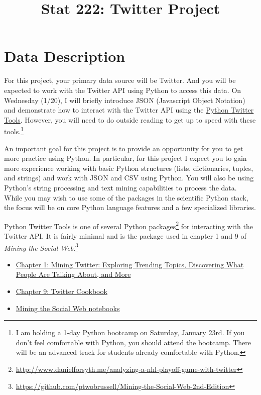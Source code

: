 \documentclass[11pt, oneside]{article}   	%
\title{Stat 222: Twitter Project}
\date{}							%
\begin{document}
\maketitle

\section{Data Description}

For this project, your primary data source will be Twitter.  And you will be
expected to work with the Twitter API using Python to access this data. On
Wednesday (1/20), I will briefly introduce JSON (Javascript Object
Notation) and demonstrate how to interact with the Twitter API using the
\href{https://github.com/sixohsix/twitter}{Python Twitter Tools}.  However, you
will need to do outside reading to get up to speed with these tools.\footnote{I
am holding a 1-day Python bootcamp on Saturday, January 23rd.  If you don't feel
comfortable with Python, you should attend the bootcamp.  There will be
an advanced track for students already comfortable with Python.}

An important goal for this project is to provide an opportunity for you to get
more practice using Python.  In particular, for this project I expect you to
gain more experience working with basic Python structures (lists, dictionaries,
tuples, and strings) and work with JSON and CSV using Python.  You will also be
using Python's string processing and text mining capabilities to process the
data.  While you may wish to use some of the packages in the scientific Python
stack, the focus will be on core Python language features and a few specialized
libraries.

Python Twitter Tools is one of several Python
packages\footnote{\url{http://www.danielforsyth.me/analyzing-a-nhl-playoff-game-with-twitter}}
for interacting with the Twitter API.  It is fairly minimal and is the package
used in chapter 1 and 9 of \emph{Mining the Social
Web}.\footnote{\url{https://github.com/ptwobrussell/Mining-the-Social-Web-2nd-Edition}}
\begin{itemize}
\item \href{https://rawgit.com/ptwobrussell/Mining-the-Social-Web-2nd-Edition/master/ipynb/html/Chapter%201%20-%20Mining%20Twitter.html}{Chapter 1: Mining Twitter: Exploring Trending Topics, Discovering What People Are Talking About, and More}
\item \href{https://rawgit.com/ptwobrussell/Mining-the-Social-Web-2nd-Edition/master/ipynb/html/Chapter%209%20-%20Twitter%20Cookbook.html}{Chapter 9: Twitter Cookbook}
\item \href{http://nbviewer.ipython.org/github/ptwobrussell/Mining-the-Social-Web-2nd-Edition/tree/master/ipynb/}{Mining the Social Web notebooks}
\end{itemize}
\end{document}
